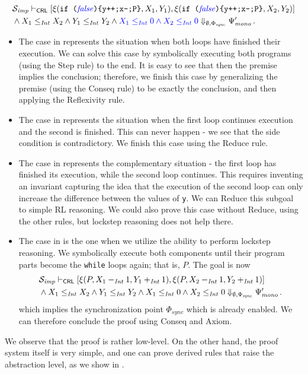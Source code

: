 \begin{equation}\label{ex:case4}
\begin{aligned}
  & \mathcal{S}_{\mathit{imp}} \vdash_{\mathsf{CRL}}
  [ \xi(\texttt{if (}{\color{blue}\mathit{false}}\texttt{)\{y++;x--;P\}}, X_1, Y_1) ,  
    \xi(\texttt{if (}{\color{blue}\mathit{false}}\texttt{)\{y++;x--;P\}}, X_2, Y_2) ] \\
  & \land X_1 \leq_{\mathit{Int}} X_2 \land Y_1 \leq_{\mathit{Int}} Y_2 \land {\color{blue} X_1 \leq_{\mathit{Int}} 0 \land X_2 \leq_{\mathit{Int}} 0 }
  \Downarrow_{\emptyset, \Phi_{\mathit{sync}}} \Psi^\prime_{\mathit{mono}} \, .
\end{aligned}
\end{equation}
\begin{itemize}
\item The case in  represents the situation when both loops have finished their execution.
We can solve this case by symbolically executing both programs (using the Step rule) to the end.
It is easy to see that then the premise implies the conclusion; therefore, we finish this case
by generalizing the premise (using the Conseq rule) to be exactly the conclusion, and then applying
the Reflexivity rule.
\item The case in  represents the situation when the first loop continues execution and the second is finished.
      This can never happen - we see that the side condition is contradictory.
      We finish this case using the Reduce rule.
\item The case in  represents the complementary situation - the first loop has finished its execution,
      while the second loop continues.
      This requires inventing an invariant capturing the idea that the execution of the second loop can only increase
      the difference between the values of \texttt{y}.
      We can Reduce this subgoal to simple RL reasoning. We could also prove this case without Reduce,
      using the other rules, but lockstep reasoning does not help there.
\item The case in  is the one when we utilize the ability to perform lockstep reasoning.
      We symbolically execute both components until their program parts become the \texttt{while} loops again;
      that is, $P$.
      The goal is now
      \begin{align*}
        & \mathcal{S}_{\mathit{imp}} \vdash_{\mathsf{CRL}}
        [ \xi(P, X_1 -_{\mathit{Int}} 1, Y_1 +_{\mathit{Int}} 1 ) ,  
          \xi(P, X_2 -_{\mathit{Int}} 1, Y_2 +_{\mathit{Int}} 1) ] \\
        & \land X_1 \leq_{\mathit{Int}} X_2 \land Y_1 \leq_{\mathit{Int}} Y_2 \land {X_1 \leq_{\mathit{Int}} 0 \land X_2 \leq_{\mathit{Int}} 0 }
        \Downarrow_{\emptyset, \Phi_{\mathit{sync}}} \Psi^\prime_{\mathit{mono}} \, .
      \end{align*}
      which implies the synchronization point $\Phi_{\mathit{sync}}$ which is already enabled.
      We can therefore conclude the proof using Conseq and Axiom.
\end{itemize}
We observe that the proof is rather low-level.
On the other hand, the proof system itself is very simple,
and one can prove derived rules that raise the abstraction level, as we show in .

